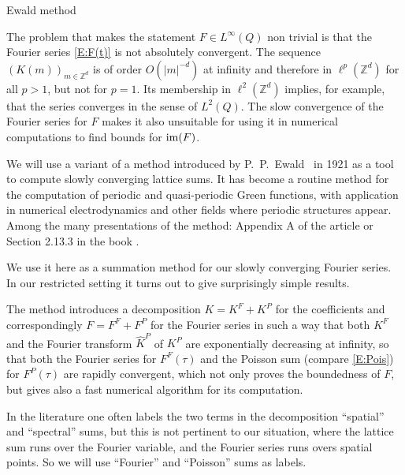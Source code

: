 \documentclass[12pt]{amsart}
\makeatletter
\def\subsection{\@startsection{section}{1}%
  \z@{1.2\linespacing\@plus\linespacing}{.5\linespacing}%
  {\normalfont\scshape\centering}}
\def\subsection{\@startsection{subsection}{2}%
  \z@{0.9\linespacing\@plus.7\linespacing}{-.5em}%
  {\normalfont\bfseries}}
\theoremstyle{definition}
\theoremstyle{remark}
\numberwithin{equation}{section}
\newcommand{\im}{\operatorname{\rm im}}
\newcommand\Z{{\mathbb Z}}
\let\hat=\widehat
\makeatother
\begin{document}
\subsection{Ewald method}\label{SS:Ewald}\ 

The problem that makes the statement $F\in L^{\infty}(Q)$ non trivial is that the Fourier series \eqref{E:F(t)} is not absolutely convergent. The sequence $(K(m))_{m\in\Z^{d}}$ is of order $O(|m|^{-d})$ at infinity and therefore in $\ell^{p}(\Z^{d})$ for all $p>1$, but not for $p=1$. Its membership in $\ell^{2}(\Z^{d})$ implies, for example, that the series converges in the sense of $L^{2}(Q)$. 
The slow convergence of the Fourier series for $F$ makes it also unsuitable for using it in numerical computations to find bounds for $\im(F)$. 

We will use a variant of a method introduced by P.~P.~Ewald~\cite{Ewald1921} in 1921 as a tool to compute slowly converging lattice sums. It has become a routine method for the computation of periodic and quasi-periodic Green functions, with application in numerical electrodynamics and other fields where periodic structures appear. Among the many presentations of the method: Appendix A of the article \cite{Essmann-et-al_1995} or Section 2.13.3 in the book \cite{Ammari-et-al_2018}.

We use it here as a summation method for our slowly converging Fourier series. In our restricted setting it turns out to give surprisingly simple results.

The method introduces a decomposition $K=K^{F}+K^{P}$ for the coefficients and correspondingly $F=F^{F}+F^{P}$ for the Fourier series in such a way that both $K^{F}$ and the Fourier transform $\hat K^{P}$ of $K^{P}$ are exponentially decreasing at infinity, so that both the Fourier series for $F^{F}(\tau)$ and the Poisson sum (compare \eqref{E:Pois}) for $F^{P}(\tau)$ are rapidly convergent, which not only proves the boundedness of $F$, but gives also a fast numerical algorithm for its computation. 

In the literature one often labels the two terms in the decomposition ``spatial'' and ``spectral'' sums, but this is not pertinent to our situation, where the lattice sum runs over the Fourier variable, and the Fourier series runs overs spatial points. So we will use ``Fourier'' and ``Poisson'' sums as labels.
\end{document}
